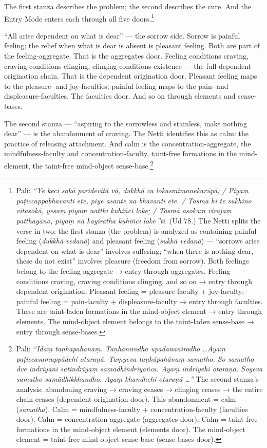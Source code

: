 The first stanza describes the problem; the second describes the cure. And the Entry Mode enters each through all five doors.\footnote{Pali: \textit{``Ye keci sokā paridevitā vā, dukkhā ca lokasmimanekarūpā; / Piyaṃ paṭiccappabhavanti ete, piye asante na bhavanti ete. / Tasmā hi te sukhino vītasokā, yesaṃ piyaṃ natthi kuhiñci loke; / Tasmā asokaṃ virajaṃ patthayāno, piyaṃ na kayirātha kuhiñci loke\,''ti.} (Ud 78.) The Netti splits the verse in two: the first stanza (the problem) is analyzed as containing painful feeling (\textit{dukkhā vedanā}) and pleasant feeling (\textit{sukhā vedanā}) --- ``sorrows arise dependent on what is dear'' involves suffering; ``when there is nothing dear, these do not exist'' involves pleasure (freedom from sorrow). Both feelings belong to the feeling aggregate → entry through aggregates. Feeling conditions craving, craving conditions clinging, and so on → entry through dependent origination. Pleasant feeling = pleasure-faculty + joy-faculty; painful feeling = pain-faculty + displeasure-faculty → entry through faculties. These are taint-laden formations in the mind-object element → entry through elements. The mind-object element belongs to the taint-laden sense-base → entry through sense-bases.}

``All arise dependent on what is dear'' --- the sorrow side. Sorrow is painful feeling; the relief when what is dear is absent is pleasant feeling. Both are part of the feeling-aggregate. That is the aggregates door. Feeling conditions craving, craving conditions clinging, clinging conditions existence --- the full dependent origination chain. That is the dependent origination door. Pleasant feeling maps to the pleasure- and joy-faculties; painful feeling maps to the pain- and displeasure-faculties. The faculties door. And so on through elements and sense-bases.

The second stanza --- ``aspiring to the sorrowless and stainless, make nothing dear'' --- is the abandonment of craving. The Netti identifies this as calm: the practice of releasing attachment. And calm is the concentration-aggregate, the mindfulness-faculty and concentration-faculty, taint-free formations in the mind-element, the taint-free mind-object sense-base.\footnote{Pali: \textit{``Idaṃ taṇhāpahānaṃ. Taṇhānirodhā upādānanirodho \ldots Ayaṃ paṭiccasamuppādehi otaraṇā. Taṃyeva taṇhāpahānaṃ samatho. So samatho dve indriyāni satindriyaṃ samādhindriyañca. Ayaṃ indriyehi otaraṇā. Soyeva samatho samādhikkhandho. Ayaṃ khandhehi otaraṇā \ldots''} The second stanza's analysis: abandoning craving → craving ceases → clinging ceases → the entire chain ceases (dependent origination door). This abandonment = calm (\textit{samatha}). Calm = mindfulness-faculty + concentration-faculty (faculties door). Calm = concentration-aggregate (aggregates door). Calm = taint-free formations in the mind-object element (elements door). The mind-object element = taint-free mind-object sense-base (sense-bases door).}

